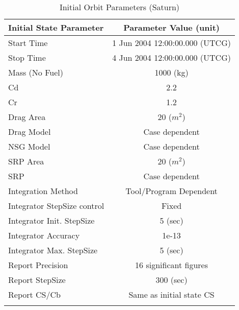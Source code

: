 \begin{table}[htbp!]
\centering \caption{Initial Orbit Parameters (Saturn)}
      \begin{tabular}{lc}
      \hline\hline
            Initial State Parameter & Parameter Value (unit)\\
            \hline
            Start Time & 1 Jun 2004 12:00:00.000 (UTCG)\\
            Stop Time & 4 Jun 2004 12:00:00.000 (UTCG)\\
            
            Mass (No Fuel) & 1000 (kg)\\
            Cd & 2.2\\
            Cr & 1.2\\
            Drag Area & 20 ($m^2$)\\
            Drag Model & Case dependent\\
            NSG Model & Case dependent\\
            SRP Area & 20 ($m^2$)\\
            SRP & Case dependent\\
            Integration Method & Tool/Program Dependent\\
            Integrator StepSize control & Fixed\\
            Integrator Init. StepSize & 5 (sec)\\
            Integrator Accuracy & 1e-13\\
            Integrator Max. StepSize & 5 (sec)\\
            Report Precision & 16 significant figures\\
            Report StepSize & 300 (sec)\\
            Report CS/Cb & Same as initial state CS\\
      \hline\hline
      \label{Table: InitStateSaturn}
\end{tabular}
\end{table}

